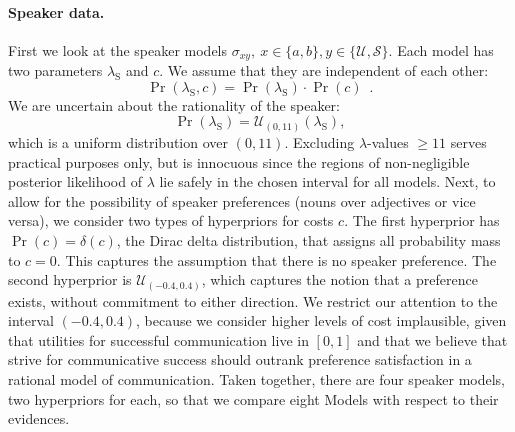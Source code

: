 \paragraph{Speaker data.} First we look at the speaker models $\sigma_{xy},\
x\in\{a,b\},y\in\{\mathcal{U},\mathcal{S}\}$. Each model has two
parameters $\lambda_\mathrm{S}$ and $c$. We assume that they are
independent of each other:
\begin{equation}\label{hyper-speaker-independent}
\Pr(\lambda_\mathrm{S},c)=\Pr(\lambda_\mathrm{S}) \cdot \Pr(c) \enspace .
\end{equation}
We are uncertain about the rationality of the speaker:
\begin{equation}\label{hyper-speaker-lambda}
\Pr(\lambda_\mathrm{S})= \mathcal{U}_{(0,11)}(\lambda_\mathrm{S}),
\end{equation}
which is a uniform distribution over $(0,11)$. Excluding
$\lambda$-values $\ge 11$ serves practical purposes only, but is
innocuous since the regions of non-negligible posterior likelihood of
$\lambda$ lie safely in the chosen interval for all models. Next, to
allow for the possibility of speaker preferences (nouns over
adjectives or vice versa), we consider two types of hyperpriors for
costs $c$. The first hyperprior has $\Pr(c)= \delta(c)$, the Dirac
delta distribution, that assigns all probability mass to $c=0$. This
captures the assumption that there is no speaker preference. The
second hyperprior is $\mathcal{U}_{(-0.4,0.4)}$, which captures the
notion that a preference exists, without commitment to either
direction. We restrict our attention to the interval $(-0.4,0.4)$,
because we consider higher levels of cost implausible, given that
utilities for successful communication live in $[0,1]$ and that we
believe that strive for communicative success should outrank
preference satisfaction in a rational model of communication. Taken
together, there are four speaker models, two hyperpriors for each, so
that we compare eight Models with respect to their evidences.

